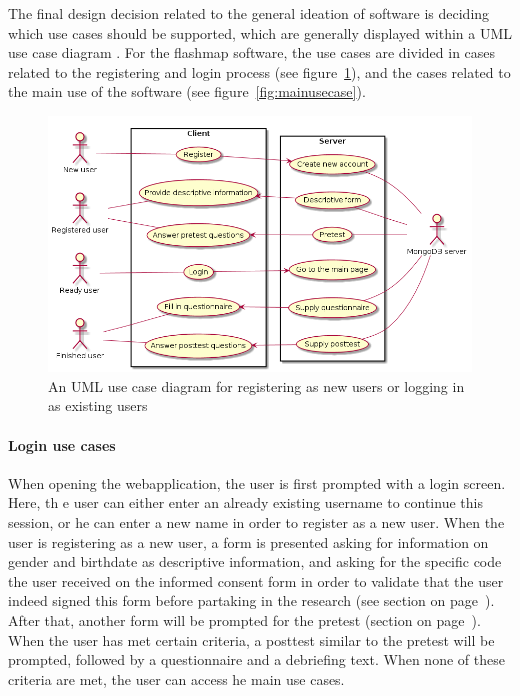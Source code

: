 The final design decision related to the general ideation of software is deciding which use cases should be supported, which are generally displayed within a UML use case diagram \cite{uml}. For the flashmap software, the use cases are divided in cases related to the registering and login process (see figure~\ref{fig:loginusecase}), and the cases related to the main use of the software (see figure~\ref{fig:mainusecase}).

\begin{figure}[h!]
\centering
\includegraphics[width=\textwidth]{img/loginusecase.png}
\caption{An UML use case diagram for registering as new users or logging in as existing users}
\label{fig:loginusecase}
\end{figure}

\paragraph{Login use cases} When opening the webapplication, the user is first prompted with a login screen. Here, th e user can either enter an already existing username to continue this session, or he can enter a new name in order to register as a new user. When the user is registering as a new user, a form is presented asking for information on gender and birthdate as descriptive information, and asking for the specific code the user received on the informed consent form in order to validate that the user indeed signed this form before partaking in the research (see section  on page~\pageref{sec:procedure}). After that, another form will be prompted for the pretest (section  on page~\pageref{sec:instrumentation}). When the user has met certain criteria, a posttest similar to the pretest will be prompted, followed by a questionnaire and a debriefing text. When none of these criteria are met, the user can access he main use cases.

